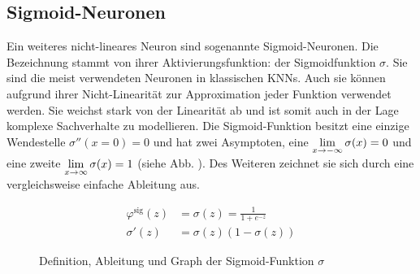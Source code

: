 \subsection{Sigmoid-Neuronen}
Ein weiteres nicht-lineares Neuron sind sogenannte Sigmoid-Neuronen.
Die Bezeichnung stammt von ihrer Aktivierungsfunktion: der Sigmoidfunktion $\sigma$.
Sie sind die meist verwendeten Neuronen in klassischen KNNs.
Auch sie können aufgrund ihrer Nicht-Linearität zur Approximation jeder Funktion
verwendet werden. Sie weichst stark von der Linearität ab und ist
somit auch in der Lage komplexe Sachverhalte zu modellieren.
\para{}
Die Sigmoid-Funktion besitzt eine einzige Wendestelle $\sigma''(x=0)=0$ und hat
zwei Asymptoten, eine $\displaystyle\lim_{x \to -\infty} \sigma(x)=0$
und eine zweite $\displaystyle\lim_{x \to \infty} \sigma(x)=1$ (siehe Abb.
). Des Weiteren zeichnet sie sich durch eine vergleichsweise
einfache Ableitung aus.
\\
\begin{figure}[h!]
  \begin{minipage}[h!]{0.5\textwidth}
    \begin{align*}
      \varphi^{\text{sig}}(z) &= \sigma(z) = \frac{1}{1 + e^{-z}}\\
      \sigma'(z)&=\sigma(z)(1-\sigma(z))
    \end{align*}
  \end{minipage}
  \begin{minipage}[h!]{0.5\textwidth}
    \centering
  \end{minipage}
  \caption{Definition, Ableitung und Graph der Sigmoid-Funktion $\sigma$}
  \label{fig:sigmoid}
\end{figure}

